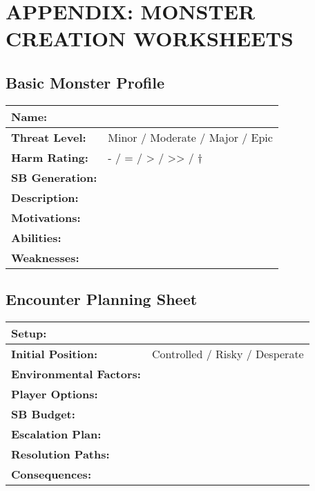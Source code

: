 \documentclass[12pt]{article}
\begin{document}

\section{APPENDIX: MONSTER CREATION WORKSHEETS}

\subsection*{Basic Monster Profile}

\begin{tabularx}{\textwidth}{|l|X|}
\hline
\textbf{Name:} & \\
\hline
\textbf{Threat Level:} & Minor / Moderate / Major / Epic \\
\hline
\textbf{Harm Rating:} & - / = / > / >> / † \\
\hline
\textbf{SB Generation:} & \\
\hline
\textbf{Description:} & \\
\hline
\textbf{Motivations:} & \\
\hline
\textbf{Abilities:} & \\
\hline
\textbf{Weaknesses:} & \\
\hline
\end{tabularx}

\subsection*{Encounter Planning Sheet}

\begin{tabularx}{\textwidth}{|l|X|}
\hline
\textbf{Setup:} & \\
\hline
\textbf{Initial Position:} & Controlled / Risky / Desperate \\
\hline
\textbf{Environmental Factors:} & \\
\hline
\textbf{Player Options:} & \\
\hline
\textbf{SB Budget:} & \\
\hline
\textbf{Escalation Plan:} & \\
\hline
\textbf{Resolution Paths:} & \\
\hline
\textbf{Consequences:} & \\
\hline
\end{tabularx}
\end{document}
